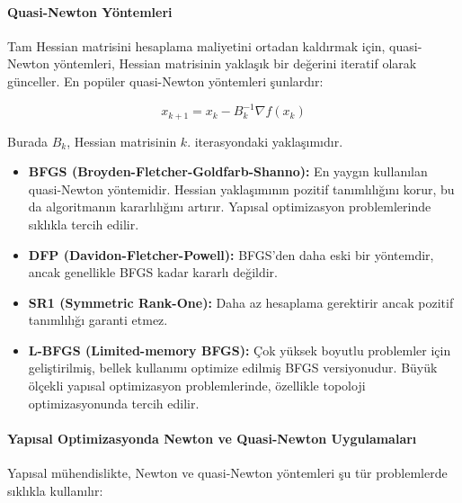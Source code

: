 \paragraph{Quasi-Newton Yöntemleri}
Tam Hessian matrisini hesaplama maliyetini ortadan kaldırmak için, quasi-Newton yöntemleri, Hessian matrisinin yaklaşık bir değerini iteratif olarak günceller. En popüler quasi-Newton yöntemleri şunlardır:

\begin{equation}
x_{k+1} = x_k - B_k^{-1} \nabla f(x_k)
\end{equation}

Burada $B_k$, Hessian matrisinin $k$. iterasyondaki yaklaşımıdır.

\begin{tcolorbox}[title=Temel Quasi-Newton Algoritmaları]
\begin{itemize}
    \item \textbf{BFGS (Broyden-Fletcher-Goldfarb-Shanno):} En yaygın kullanılan quasi-Newton yöntemidir. Hessian yaklaşımının pozitif tanımlılığını korur, bu da algoritmanın kararlılığını artırır. Yapısal optimizasyon problemlerinde sıklıkla tercih edilir.
    
    \item \textbf{DFP (Davidon-Fletcher-Powell):} BFGS'den daha eski bir yöntemdir, ancak genellikle BFGS kadar kararlı değildir.
    
    \item \textbf{SR1 (Symmetric Rank-One):} Daha az hesaplama gerektirir ancak pozitif tanımlılığı garanti etmez.
    
    \item \textbf{L-BFGS (Limited-memory BFGS):} Çok yüksek boyutlu problemler için geliştirilmiş, bellek kullanımı optimize edilmiş BFGS versiyonudur. Büyük ölçekli yapısal optimizasyon problemlerinde, özellikle topoloji optimizasyonunda tercih edilir.
\end{itemize}
\end{tcolorbox}

\paragraph{Yapısal Optimizasyonda Newton ve Quasi-Newton Uygulamaları}
Yapısal mühendislikte, Newton ve quasi-Newton yöntemleri şu tür problemlerde sıklıkla kullanılır:

